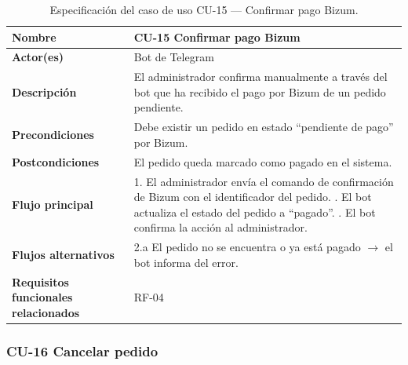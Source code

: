 \begin{table}[H]
\centering
\small
\begin{tabular}{|m{}|m{}|}
\hline
\textbf{Nombre} & CU-15 Confirmar pago Bizum \\ \hline
\textbf{Actor(es)} & Bot de Telegram \\ \hline
\textbf{Descripción} & El administrador confirma manualmente a través del bot que ha recibido el pago por Bizum de un pedido pendiente. \\ \hline
\textbf{Precondiciones} & Debe existir un pedido en estado ``pendiente de pago'' por Bizum. \\ \hline
\textbf{Postcondiciones} & El pedido queda marcado como pagado en el sistema. \\ \hline
\textbf{Flujo principal} & 1. El administrador envía el comando de confirmación de Bizum con el identificador del pedido. \newline 2. El bot actualiza el estado del pedido a ``pagado''. \newline 3. El bot confirma la acción al administrador. \\ \hline
\textbf{Flujos alternativos} & 2.a El pedido no se encuentra o ya está pagado $\rightarrow$ el bot informa del error. \\ \hline
\textbf{Requisitos funcionales relacionados} & RF-04 \\ \hline
\end{tabular}
\caption{Especificación del caso de uso CU-15 — Confirmar pago Bizum.}
\end{table}

\subsubsection{CU-16 Cancelar pedido}

